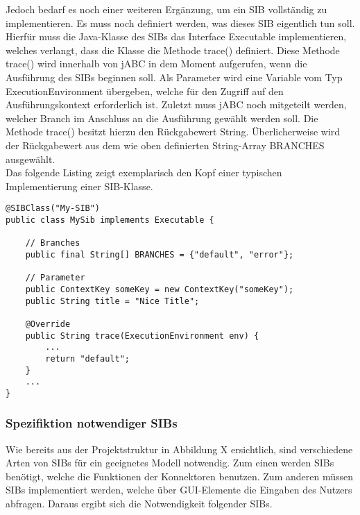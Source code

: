 Jedoch bedarf es noch einer weiteren Ergänzung, um ein SIB vollständig zu implementieren. Es muss noch definiert werden, was dieses SIB eigentlich tun soll. Hierfür muss die Java-Klasse des SIBs das Interface Executable implementieren, welches verlangt, dass die Klasse die Methode trace() definiert. Diese Methode trace() wird innerhalb von jABC in dem Moment aufgerufen, wenn die Ausführung des SIBs beginnen soll. Als Parameter wird eine Variable vom Typ ExecutionEnvironment übergeben, welche für den Zugriff auf den Ausführungskontext erforderlich ist. Zuletzt muss jABC noch mitgeteilt werden, welcher Branch im Anschluss an die Ausführung gewählt werden soll. Die Methode trace() besitzt hierzu den Rückgabewert String. Überlicherweise wird der Rückgabewert aus dem wie oben definierten String-Array BRANCHES ausgewählt.\\

Das folgende Listing zeigt exemplarisch den Kopf einer typischen Implementierung einer SIB-Klasse.

\begin{lstlisting}
@SIBClass("My-SIB")
public class MySib implements Executable {

	// Branches
    public final String[] BRANCHES = {"default", "error"};

    // Parameter
    public ContextKey someKey = new ContextKey("someKey");
    public String title = "Nice Title";

    @Override
    public String trace(ExecutionEnvironment env) {
        ...
		return "default";
    }
	...
}
\end{lstlisting}


\subsubsection{Spezifiktion notwendiger SIBs}
Wie bereits aus der Projektstruktur in Abbildung X ersichtlich, sind verschiedene Arten von SIBs für ein geeignetes Modell notwendig. Zum einen werden SIBs benötigt, welche die Funktionen der Konnektoren benutzen. Zum anderen müssen SIBs implementiert werden, welche über GUI-Elemente die Eingaben des Nutzers abfragen. Daraus ergibt sich die Notwendigkeit folgender SIBs.\\

